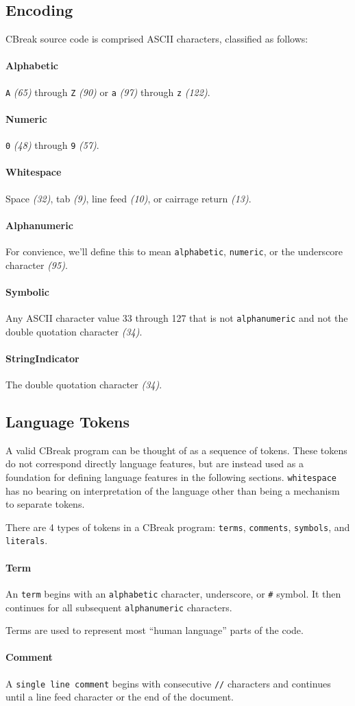 \documentclass{article}
\newcommand{\code}[1]{\colorbox{light-gray}{\texttt{#1}}}
\newcommand{\breakingparagraph}[1]{\paragraph{#1}\mbox{}\medbreak}
\begin{document}
\subsection{Encoding}
CBreak source code is comprised ASCII characters, classified as follows:

\breakingparagraph{Alphabetic}
\code{A} \textit{(65)} through \code{Z} \textit{(90)} or \code{a} \textit{(97)} through \code{z} \textit{(122)}.

\breakingparagraph{Numeric}
\code{0} \textit{(48)} through \code{9} \textit{(57)}.

\breakingparagraph{Whitespace}
Space \textit{(32)}, tab \textit{(9)}, line feed \textit{(10)}, or cairrage return \textit{(13)}.

\breakingparagraph{Alphanumeric}
For convience, we'll define this to mean \code{alphabetic}, \code{numeric}, or the underscore character \textit{(95)}.

\breakingparagraph{Symbolic}
Any ASCII character value 33 through 127 that is not \code{alphanumeric} and not the double quotation character \textit{(34)}.

\breakingparagraph{StringIndicator}
The double quotation character \textit{(34)}.

\newpage


\subsection{Language Tokens}
A valid CBreak program can be thought of as a sequence of tokens.  These tokens do not correspond directly language features, but are instead used as a foundation for defining language features in the following sections.  \code{whitespace} has no bearing on interpretation of the language other than being a mechanism to separate tokens.

There are 4 types of tokens in a CBreak program: \code{terms}, \code{comments}, \code{symbols}, and \code{literals}.

\breakingparagraph{Term}
An \code{term} begins with an \code{alphabetic} character, underscore, or \code{\#} symbol.  It then continues for all subsequent \code{alphanumeric} characters.

Terms are used to represent most ``human language'' parts of the code.

\breakingparagraph{Comment}
A \code{single line comment} begins with consecutive \code{//} characters and continues until a line feed character or the end of the document.
\end{document}
